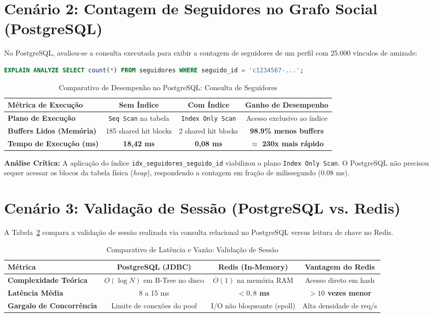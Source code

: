 \documentclass[12pt,a4paper]{report}
\begin{document}
\section{Cenário 2: Contagem de Seguidores no Grafo Social (PostgreSQL)}
No PostgreSQL, avaliou-se a consulta executada para exibir a contagem de seguidores de um perfil com 25.000 vínculos de amizade:
\begin{lstlisting}[language=SQL]
EXPLAIN ANALYZE SELECT count(*) FROM seguidores WHERE seguido_id = 'c1234567-...';
\end{lstlisting}

\begin{table}[H]
\centering
\small
\caption{Comparativo de Desempenho no PostgreSQL: Consulta de Seguidores}
\label{tab:bench_postgres}
\begin{tabular}{@{}lccc@{}}
\toprule
\textbf{Métrica de Execução} & \textbf{Sem Índice} & \textbf{Com Índice} & \textbf{Ganho de Desempenho} \\ \midrule
\textbf{Plano de Execução} & \texttt{Seq Scan} na tabela & \texttt{Index Only Scan} & Acesso exclusivo ao índice \\
\textbf{Buffers Lidos (Memória)} & 185 shared hit blocks & 2 shared hit blocks & \textbf{98.9\% menos buffers} \\
\textbf{Tempo de Execução (ms)} & \textbf{18,42 ms} & \textbf{0,08 ms} & \textbf{$\approx$ 230x mais rápido} \\ \bottomrule
\end{tabular}
\end{table}

\textbf{Análise Crítica:} A aplicação do índice \texttt{idx\_seguidores\_seguido\_id} viabilizou o plano \texttt{Index Only Scan}. O PostgreSQL não precisou sequer acessar os blocos da tabela física (\textit{heap}), respondendo a contagem em fração de milissegundo ($0.08$ ms).

\section{Cenário 3: Validação de Sessão (PostgreSQL vs. Redis)}
A Tabela~\ref{tab:bench_redis} compara a validação de sessão realizada via consulta relacional no PostgreSQL versus leitura de chave no Redis.

\begin{table}[H]
\centering
\small
\caption{Comparativo de Latência e Vazão: Validação de Sessão}
\label{tab:bench_redis}
\begin{tabular}{@{}lccc@{}}
\toprule
\textbf{Métrica} & \textbf{PostgreSQL (JDBC)} & \textbf{Redis (In-Memory)} & \textbf{Vantagem do Redis} \\ \midrule
\textbf{Complexidade Teórica} & $O(\log N)$ em B-Tree no disco & $O(1)$ na memória RAM & Acesso direto em hash \\
\textbf{Latência Média} & 8 a 15 ms & \textbf{$< 0,8$ ms} & \textbf{$> 10$ vezes menor} \\
\textbf{Gargalo de Concorrência} & Limite de conexões do pool & I/O não bloqueante (epoll) & Alta densidade de req/s \\ \bottomrule
\end{tabular}
\end{table}
\end{document}
